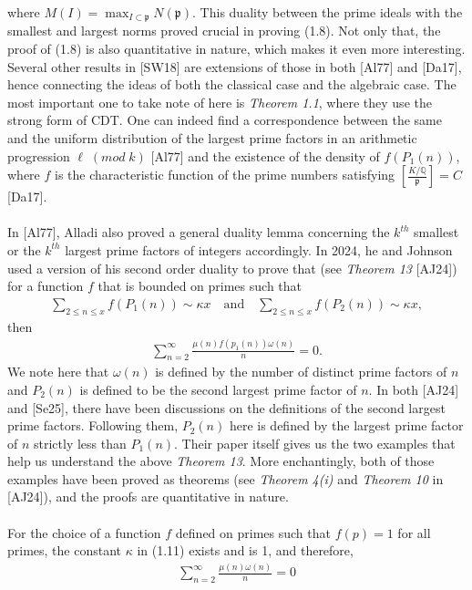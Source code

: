 \documentclass[12pt]{article}
\numberwithin{equation}{section}
\numberwithin{equation}{section}
\begin{document}
where $M(I) = \max_{I \subset \mathfrak{p}}N(\mathfrak{p})$. This duality between the prime ideals with the smallest and largest norms proved crucial in proving (1.8). Not only that, the proof of (1.8) is also quantitative in nature, which makes it even more interesting. Several other results in [SW18] are extensions of those in both [Al77] and [Da17], hence connecting the ideas of both the classical case and the algebraic case. The most important one to take note of here is \textit{Theorem 1.1}, where they use the strong form of CDT. One can indeed find a correspondence between the same and the uniform distribution of the largest prime factors in an arithmetic progression $\ell\;(mod\;k)$ [Al77] and the existence of the density of $f(P_1(n))$, where $f$ is the characteristic function of the prime numbers satisfying $\left[\frac{K/\mathbb{Q}}{\mathfrak{p}}\right]=C$ [Da17]. \\ \\
In [Al77], Alladi also proved a general duality lemma concerning the $k^{th}$ smallest or the $k^{th}$ largest prime factors of integers accordingly. In 2024, he and Johnson used a version of his second order duality to prove that (see \textit{Theorem 13} [AJ24]) for a function $f$ that is bounded on primes such that
\begin{align}
    \sum_{2 \leq n \leq x}f(P_1(n)) \sim \kappa x \quad \text{and} \quad \sum_{2 \leq n \leq x} f(P_2(n)) \sim \kappa x,
\end{align}
then
\begin{align}
    \sum_{n=2}^{\infty} \frac{\mu(n)f(p_1(n))\omega(n)}{n}=0.
\end{align}
We note here that $\omega(n)$ is defined by the number of distinct prime factors of $n$ and $P_2(n)$ is defined to be the second largest prime factor of $n$. In both [AJ24] and [Se25], there have been discussions on the definitions of the second largest prime factors. Following them, $P_2(n)$ here is defined by the largest prime factor of $n$ strictly less than $P_1(n)$. Their paper itself gives us the two examples that help us understand the above \textit{Theorem 13}. More enchantingly, both of those examples have been proved as theorems (see \textit{Theorem 4(i)} and \textit{Theorem 10} in [AJ24]), and the proofs are quantitative in nature. \\ \\
For the choice of a function $f$ defined on primes such that $f(p)=1$ for all primes, the constant $\kappa$ in (1.11) exists and is 1, and therefore,
\begin{align}
    \sum_{n=2}^{\infty}\frac{\mu(n)\omega(n)}{n} =0
\end{align}
\end{document}
